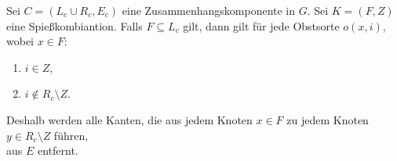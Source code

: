 \begin{korollar}\label{kor:komponente-mengen}
Sei $C = (L_c \cup R_c, E_c)$ eine Zusammenhangskomponente in $G$.
Sei $K = (F, Z)$ eine Spießkombiantion.
Falls $F \subseteq L_c$ gilt, dann gilt für jede Obstsorte $o(x, i)$, wobei $x \in F$:
\begin{enumerate}[label={\upshape(\roman*)}]
	\item $i \in Z$,
	\item $i \notin R_c \setminus Z$.
\end{enumerate}
Deshalb werden alle Kanten, die aus jedem Knoten $x \in F$ 
zu jedem Knoten $y \in R_c \setminus Z$ führen,\\ aus $E$ entfernt.
\end{korollar}

\begin{comment}
\begin{proof}
\ref{lem:komponente-mengen1} gilt nach Defintion \ref{def:spiesskomb}, Axiom \ref{ax:obstsorte-index}
und Lemma \ref{lem:spiess-numbers}.\\
\ref{lem:komponente-mengen2} gilt aus dem Grund, dass $L_c$ und $R_c$ gleichmächtig sind.
(Sonst, könnte man nicht allen $x \in A$ einen $y \in B$ zuweisen.)
\TODO{Beweis zu Ende}
\end{proof}
\end{comment}
